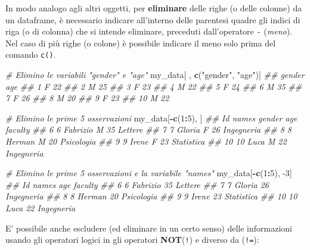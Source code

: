 \documentclass[
]{book}
\newenvironment{Shaded}{\begin{snugshade}}{\end{snugshade}}
\newcommand{\CommentTok}[1]{\textcolor[rgb]{0.56,0.35,0.01}{\textit{#1}}}
\newcommand{\DecValTok}[1]{\textcolor[rgb]{0.00,0.00,0.81}{#1}}
\newcommand{\KeywordTok}[1]{\textcolor[rgb]{0.13,0.29,0.53}{\textbf{#1}}}
\newcommand{\NormalTok}[1]{#1}
\newcommand{\OperatorTok}[1]{\textcolor[rgb]{0.81,0.36,0.00}{\textbf{#1}}}
\newcommand{\StringTok}[1]{\textcolor[rgb]{0.31,0.60,0.02}{#1}}
\begin{document}
In modo analogo agli altri oggetti, per \textbf{eliminare} delle righe (o delle colonne) da un dataframe, è necessario indicare all'interno delle parentesi quadre gli indici di riga (o di colonna) che si intende eliminare, preceduti dall'operatore \texttt{-} (\emph{meno}). Nel caso di più righe (o colone) è possibile indicare il meno solo prima del comando \texttt{c()}.

\begin{Shaded}
\begin{Highlighting}[]
\CommentTok{# Elimino le variabili "gender" e "age"}
\NormalTok{my_data[ , }\KeywordTok{c}\NormalTok{(}\StringTok{"gender"}\NormalTok{, }\StringTok{"age"}\NormalTok{)]}
\CommentTok{##    gender age}
\CommentTok{## 1       F  22}
\CommentTok{## 2       M  25}
\CommentTok{## 3       F  23}
\CommentTok{## 4       M  22}
\CommentTok{## 5       F  24}
\CommentTok{## 6       M  35}
\CommentTok{## 7       F  26}
\CommentTok{## 8       M  20}
\CommentTok{## 9       F  23}
\CommentTok{## 10      M  22}

\CommentTok{# Elimino le prime 5 osservazioni}
\NormalTok{my_data[}\OperatorTok{-}\KeywordTok{c}\NormalTok{(}\DecValTok{1}\OperatorTok{:}\DecValTok{5}\NormalTok{), ]}
\CommentTok{##    Id    names gender age    faculty}
\CommentTok{## 6   6 Fabrizio      M  35    Lettere}
\CommentTok{## 7   7   Gloria      F  26 Ingegneria}
\CommentTok{## 8   8   Herman      M  20 Psicologia}
\CommentTok{## 9   9    Irene      F  23 Statistica}
\CommentTok{## 10 10     Luca      M  22 Ingegneria}

\CommentTok{# Elimino le prime 5 osservazioni e la variabile "names"}
\NormalTok{my_data[}\OperatorTok{-}\KeywordTok{c}\NormalTok{(}\DecValTok{1}\OperatorTok{:}\DecValTok{5}\NormalTok{), }\DecValTok{-3}\NormalTok{]}
\CommentTok{##    Id    names age    faculty}
\CommentTok{## 6   6 Fabrizio  35    Lettere}
\CommentTok{## 7   7   Gloria  26 Ingegneria}
\CommentTok{## 8   8   Herman  20 Psicologia}
\CommentTok{## 9   9    Irene  23 Statistica}
\CommentTok{## 10 10     Luca  22 Ingegneria}
\end{Highlighting}
\end{Shaded}

E' possibile anche escludere (ed eliminare in un certo senso) delle informazioni usando gli operatori logici in gli operatori \textbf{NOT}(\texttt{!}) e diverso da (\texttt{!=}):
\end{document}
